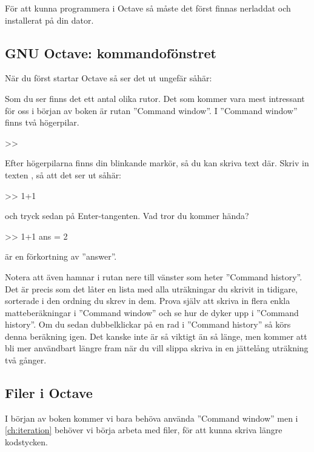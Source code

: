 För att kunna programmera i Octave så måste det först finnas nerladdat och installerat på din dator.


\subsection{GNU Octave: kommandofönstret}
När du först startar Octave så ser det ut ungefär såhär:


Som du ser finns det ett antal olika rutor. Det som kommer vara mest intressant för oss i början av boken är rutan ''Command window''. I ''Command window'' finns två högerpilar.

\begin{matlab}[caption={Tom kommando-rad},label={}]
>>
\end{matlab}

Efter högerpilarna finns din blinkande markör, så du kan skriva text där. Skriv in texten , så att det ser ut såhär:

\begin{matlab}[caption={Skrivit in lite matte},label={}]
>> 1+1
\end{matlab}

och tryck sedan på Enter-tangenten. Vad tror du kommer hända?

\begin{matlab}[caption={Hurra, datorn kan räkna!},label={}]
>> 1+1
ans = 2
\end{matlab}

 är en förkortning av ''answer''.

Notera att  även hamnar i rutan nere till vänster som heter ''Command history''. Det är precis som det låter en lista med alla uträkningar du skrivit in tidigare, sorterade i den ordning du skrev in dem. Prova själv att skriva in flera enkla matteberäkningar i ''Command window'' och se hur de dyker upp i ''Command history''. Om du sedan dubbelklickar på en rad i ''Command history'' så körs denna beräkning igen. Det kanske inte är så viktigt än så länge, men kommer att bli mer användbart längre fram när du vill slippa skriva in en jättelång uträkning två gånger.

\subsection{Filer i Octave}
I början av boken kommer vi bara behöva använda ''Command window'' men i \autoref{ch:iteration} behöver vi börja arbeta med filer, för att kunna skriva längre kodstycken.

